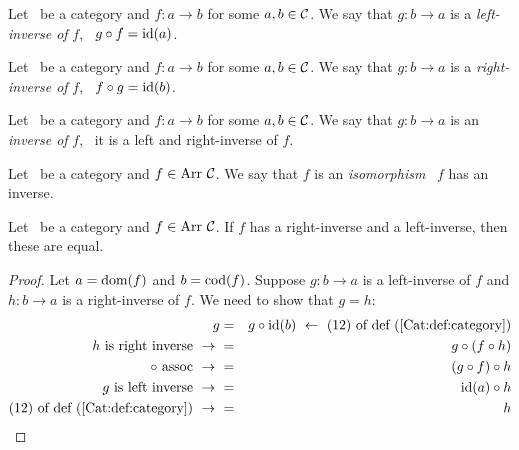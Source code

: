 \begin{defin}\label{Cat:def:left:inverse}
    Let \Cat\ be a category and $f:a\to b$ for some $a,b\in\mbox{$\cal C$}$. 
    We say that $g:b \to a$ is a {\em left-inverse of} $f$, \ifand\ 
    $g\circ f=\mbox{\rm id}(a)$.
\end{defin}

\begin{defin}\label{Cat:def:right:inverse}
    Let \Cat\ be a category and $f:a\to b$ for some $a,b\in\mbox{$\cal C$}$. 
    We say that $g:b \to a$ is a {\em right-inverse of} $f$, \ifand\ 
    $f\circ g=\mbox{\rm id}(b)$.
\end{defin}

\begin{defin}\label{Cat:def:inverse}
    Let \Cat\ be a category and $f:a\to b$ for some $a,b\in\mbox{$\cal C$}$. 
    We say that $g:b \to a$ is an {\em inverse of} $f$, \ifand\ 
    it is a left and right-inverse of $f$.
\end{defin}

\begin{defin}\label{Cat:def:isomorphism}
    Let \Cat\ be a category and $f\in\arr\ \Cat$. We say that $f$ is
    an {\em isomorphism} \ifand\ $f$ has an inverse.
\end{defin}

\begin{prop}\label{Cat:prop:inverse:unique}
    Let \Cat\ be a category and $f\in\arr\ \Cat$. If $f$
    has a right-inverse and a left-inverse, then these are equal.
\end{prop}
\begin{proof}
    Let $a=\mbox{\rm dom}(f)$ and $b=\mbox{\rm cod}(f)$. Suppose $g:b\to a$ is a left-inverse of 
    $f$ and $h:b \to a$ is a right-inverse of $f$. We need to show that $g=h$:
    \begin{eqnarray*}g
        &=&g\circ\id(b)\ \leftarrow\ 
        \mbox{$(12)$ of def~(\ref{Cat:def:category})}\\
        \mbox{$h$ is right inverse}\ \to\ 
        &=&g\circ(f\circ h)\\
        \mbox{$\circ$ assoc}\ \to\ 
        &=&(g\circ f)\circ h\\
        \mbox{$g$ is left inverse}\ \to\ 
        &=&\id(a)\circ h\\
        \mbox{$(12)$ of def~(\ref{Cat:def:category})}\ \to\ 
        &=&h
    \end{eqnarray*}
\end{proof}
